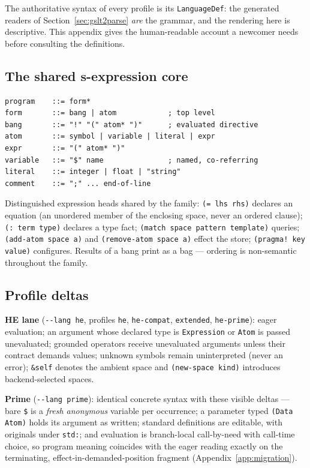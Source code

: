 \documentclass[11pt]{article}
\newcommand{\code}[1]{\texttt{#1}}
\newcommand{\HE}{\textup{HE}}
\begin{document}
The authoritative syntax of every profile is its \code{LanguageDef}: the
generated readers of Section~\ref{sec:gslt2parse} \emph{are} the
grammar, and the rendering here is descriptive.  This appendix gives the
human-readable account a newcomer needs before consulting the
definitions.

\subsection{The shared s-expression core}

\begin{verbatim}
program    ::= form*
form       ::= bang | atom            ; top level
bang       ::= "!" "(" atom* ")"      ; evaluated directive
atom       ::= symbol | variable | literal | expr
expr       ::= "(" atom* ")"
variable   ::= "$" name               ; named, co-referring
literal    ::= integer | float | "string"
comment    ::= ";" ... end-of-line
\end{verbatim}

Distinguished expression heads shared by the family: \code{(= lhs rhs)}
declares an equation (an unordered member of the enclosing space, never
an ordered clause); \code{(: term type)} declares a type fact;
\code{(match space pattern template)} queries; \code{(add-atom space a)}
and \code{(remove-atom space a)} effect the store;
\code{(pragma!\ key value)} configures.  Results of a bang print as a
bag --- ordering is non-semantic throughout the family.

\subsection{Profile deltas}

\textbf{\HE{} lane} (\code{-{}-lang he}, profiles \code{he},
\code{he-compat}, \code{extended}, \code{he-prime}): eager evaluation; an
argument whose declared type is \code{Expression} or \code{Atom} is passed
unevaluated; grounded
operators receive unevaluated arguments unless their contract demands
values; unknown symbols remain uninterpreted (never an error);
\code{\&self} denotes the ambient space and \code{(new-space kind)}
introduces backend-selected spaces.

\textbf{Prime} (\code{-{}-lang prime}): identical concrete syntax with
these visible deltas --- bare \code{\$} is a \emph{fresh anonymous}
variable per occurrence; a parameter typed \code{(Data Atom)} holds its
argument as written; standard definitions are editable, with originals
under \code{std:}; and evaluation is branch-local call-by-need
with call-time choice, so program meaning coincides with the eager
reading exactly on the terminating, effect-in-demanded-position
fragment (Appendix~\ref{app:migration}).
\end{document}
